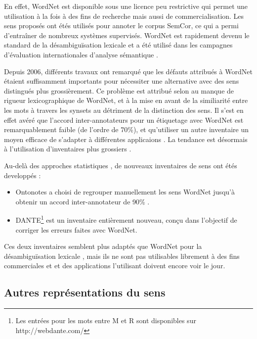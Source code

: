 En effet, WordNet est disponible sous une licence peu restrictive qui permet une utilisation à la fois à des fins de recherche mais aussi de commercialisation. Les sens proposés ont étés utilisés pour annoter le corpus SemCor, ce qui a permi d'entraîner de nombreux systèmes supervisés. WordNet est rapidement devenu le standard de la désambiguïsation lexicale et a été utilisé dans les campagnes d'évaluation internationales d'analyse sémantique \citep{navigli2009word}.

Depuis 2006, différents travaux \citep{navigli2007semeval,hovy2006ontonotes} ont remarqué que les défauts attribués à WordNet \citep{snow2007learning,ide2007making} étaient suffisamment importants pour nécessiter une alternative avec des sens distingués plus grossièrement. Ce problème est attribué selon \cite{edmonds2002introduction} au manque de rigueur lexicographique de WordNet, et à la mise en avant de la similiarité entre les mots à travers les synsets au détriment de la distinction des sens. Il s'est en effet avéré que l'accord inter-annotateurs pour un étiquetage avec WordNet est remarquablement faible (de l'ordre de 70\%), et qu'utiliser un autre inventaire un moyen efficace de s'adapter à différentes applicaions \citep{palmer2004different}. La tendance est désormais à l'utilisation d'inventaires plus grossiers \citep{navigli2007semeval,navigli2012quick}.

Au-delà des approches statistiques \citep{snow2007learning}, de nouveaux inventaires de sens ont étés developpés :
\begin{itemize}
    \item Ontonotes \citep{hovy2006ontonotes} a choisi de regrouper manuellement les sens WordNet jusqu'à obtenir un accord inter-annotateur de 90\% .
    \item DANTE\footnote{Les entrées pour les mots entre M et R sont disponibles sur http://webdante.com/} \citep{mccarthy2010dante} est un inventaire entièrement nouveau, conçu dans l'objectif de corriger les erreurs faites avec WordNet\citep{kilgarriff2010detailed}.
\end{itemize}

Ces deux inventaires semblent plus adaptés que WordNet pour la désambiguïsation lexicale \citep{navigli2012quick}, mais ils ne sont pas utilisables librement à des fins commerciales et et des applications l'utilisant doivent encore voir le jour.

\subsection{Autres représentations du sens}
\label{sensfunky}

